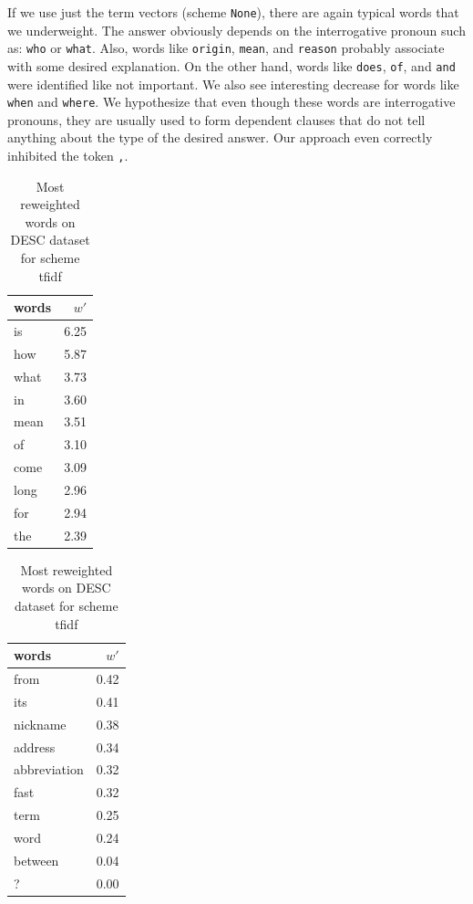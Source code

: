     If we use just the term vectors (scheme \texttt{None}), there are again typical words that we underweight.
    The answer obviously depends on the interrogative pronoun such as: \texttt{who} or \texttt{what}.
    Also, words like \texttt{origin}, \texttt{mean}, and \texttt{reason} probably associate with some desired explanation.
    On the other hand, words like \texttt{does}, \texttt{of}, and \texttt{and} were identified like not important.
    We also see interesting decrease for words like \texttt{when} and \texttt{where}.
    We hypothesize that even though these words are interrogative pronouns, they are usually used to form dependent clauses that do not tell anything about the type of the desired answer.
    Our approach even correctly inhibited the token \texttt{,}.
 

\begin{table}[h]
    \centering
    \begin{minipage}{.4\linewidth}
      \centering
        \begin{tabular}{lr}
\toprule
words &  $w'$ \\
\midrule
   is &  6.25 \\
  how &  5.87 \\
 what &  3.73 \\
   in &  3.60 \\
 mean &  3.51 \\
   of &  3.10 \\
 come &  3.09 \\
 long &  2.96 \\
  for &  2.94 \\
  the &  2.39 \\
\bottomrule
\end{tabular}

    \end{minipage}
    \begin{minipage}{.4\linewidth}
      \centering
        \begin{tabular}{lr}
\toprule
        words &  $w'$ \\
\midrule
         from &  0.42 \\
          its &  0.41 \\
     nickname &  0.38 \\
      address &  0.34 \\
 abbreviation &  0.32 \\
         fast &  0.32 \\
         term &  0.25 \\
         word &  0.24 \\
      between &  0.04 \\
            ? &  0.00 \\
\bottomrule
\end{tabular}

    \end{minipage} 
    \caption{Most reweighted words on DESC dataset for scheme tfidf}
    \label{tab:words:trec:tfidf}
\end{table}

